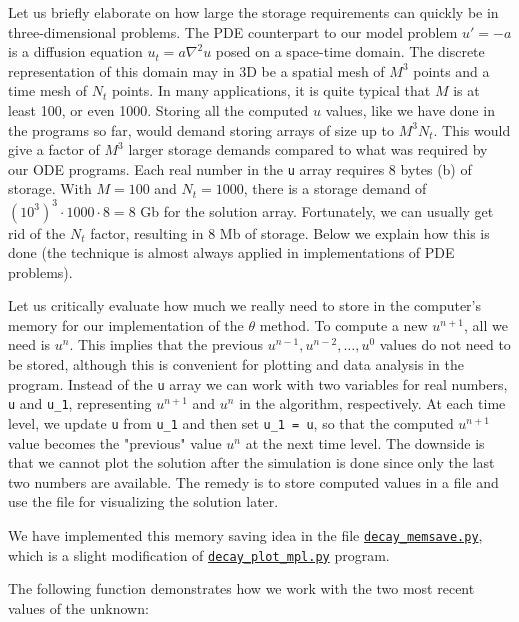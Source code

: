 \documentclass[graybox,sectrefs,envcountresetchap,open=right,final]{svmonodo}
\begin{document}
Let us briefly elaborate on how large the storage requirements can
quickly be in three-dimensional problems.  The PDE counterpart to our
model problem $u'=-a$ is a diffusion equation $u_t = a\nabla^2 u$
posed on a space-time domain. The discrete representation of this
domain may in 3D be a spatial mesh of $M^3$ points and a time mesh of
$N_t$ points.  In many applications, it is quite typical that $M$ is
at least 100, or even 1000.  Storing all the computed $u$ values, like
we have done in the programs so far, would demand storing arrays of
size up to $M^3N_t$. This would give a factor of $M^3$ larger storage
demands compared to what was required by our ODE programs. Each real
number in the \texttt{u} array requires 8 bytes (b) of storage. With $M=100$
and $N_t=1000$, there is a storage demand of $(10^3)^3\cdot 1000\cdot
8 = 8$ Gb for the solution array.  Fortunately, we can usually get rid
of the $N_t$ factor, resulting in 8 Mb of storage.  Below we explain
how this is done (the technique is almost always applied in
implementations of PDE problems).


Let us critically evaluate how much we really need to store in the
computer's memory for our implementation of the $\theta$ method. To
compute a new $u^{n+1}$, all we need is $u^n$. This implies that the
previous $u^{n-1},u^{n-2},\dots,u^0$ values do not need to be stored,
although this is convenient for plotting and data analysis in the
program.  Instead of the \texttt{u} array we can work with two variables for
real numbers, \texttt{u} and \Verb!u_1!, representing $u^{n+1}$ and $u^n$ in the
algorithm, respectively.  At each time level, we update \texttt{u} from \Verb!u_1!
and then set \Verb!u_1 = u!, so that the computed $u^{n+1}$ value becomes
the "previous" value $u^n$ at the next time level. The downside is
that we cannot plot the solution after the simulation is done since
only the last two numbers are available.  The remedy is to store
computed values in a file and use the file for visualizing the
solution later.

We have implemented this memory saving idea in the file
\href{{http://tinyurl.com/ofkw6kc/alg/decay_memsave.py}}{\nolinkurl{decay_memsave.py}}, which is a
slight modification of \href{{http://tinyurl.com/ofkw6kc/alg/decay_plot_mpl.py}}{\nolinkurl{decay_plot_mpl.py}} program.

The following function demonstrates how we work with the two most
recent values of the unknown:
\end{document}
